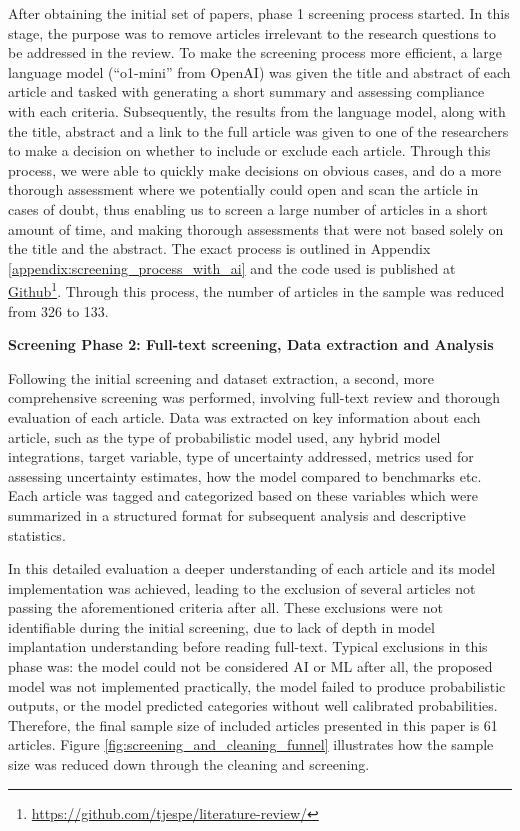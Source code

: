 After obtaining the initial set of papers, phase 1 screening process started. In this stage, the purpose was to remove articles irrelevant to the research questions to be addressed in the review.
To make the screening process more efficient, a large language model (``o1-mini'' from OpenAI) was given the title and abstract of each article and tasked with generating a short summary and assessing compliance with each criteria. Subsequently, the results from the language model, along with the title, abstract and a link to the full article was given to one of the researchers to make a decision on whether to include or exclude each article. Through this process, we were able to quickly make decisions on obvious cases, and do a more thorough assessment where we potentially could open and scan the article in cases of doubt, thus enabling us to screen a large number of articles in a short amount of time, and making thorough assessments that were not based solely on the title and the abstract. The exact process is outlined in Appendix \ref{appendix:screening_process_with_ai} and the code used is published at \href{https://github.com/tjespe/literature-review/}{Github}\footnote{\label{footnote:github_link}\href{https://github.com/tjespe/literature-review/}{https://github.com/tjespe/literature-review/}}. Through this process, the number of articles in the sample was reduced from 326 to 133.




\textbf{Screening Phase 2: Full-text screening, Data extraction and Analysis}\nopagebreak

Following the initial screening and dataset extraction, a second, more comprehensive screening was performed, involving full-text review and thorough evaluation of each article. Data was extracted on key information about each article, such as the type of probabilistic model used, any hybrid model integrations, target variable, type of uncertainty addressed, metrics used for assessing uncertainty estimates, how the model compared to benchmarks etc. Each article was tagged and categorized based on these variables which were summarized in a structured format for subsequent analysis and descriptive statistics. 

In this detailed evaluation a deeper understanding of each article and its model implementation was achieved, leading to the exclusion of several articles not passing the aforementioned criteria after all. These exclusions were not identifiable during the initial screening, due to lack of depth in model implantation understanding before reading full-text. Typical exclusions in this phase was: the model could not be considered AI or ML after all, the proposed model was not implemented practically, the model failed to produce probabilistic outputs, or the model predicted categories without well calibrated probabilities. Therefore, the final sample size of included articles presented in this paper is 61 articles. Figure \ref{fig:screening_and_cleaning_funnel} illustrates how the sample size was reduced down through the cleaning and screening. 

